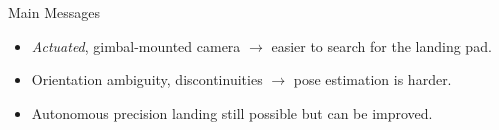 \documentclass[aspectratio=169]{beamer}
\newif\ifpause
\newcommand{\mypause}{\ifpause \pause \fi}
\begin{document}
\begin{frame}{Main Messages}
	\begin{itemize}
		\item \emph{Actuated}, gimbal-mounted camera
			$\rightarrow$ easier to search for the landing pad.
		\mypause\item Orientation ambiguity, discontinuities
			$\rightarrow$ pose estimation is harder.
		\mypause\item Autonomous precision landing still possible
			but can be improved.
	\end{itemize}
\end{frame}

\end{document}
